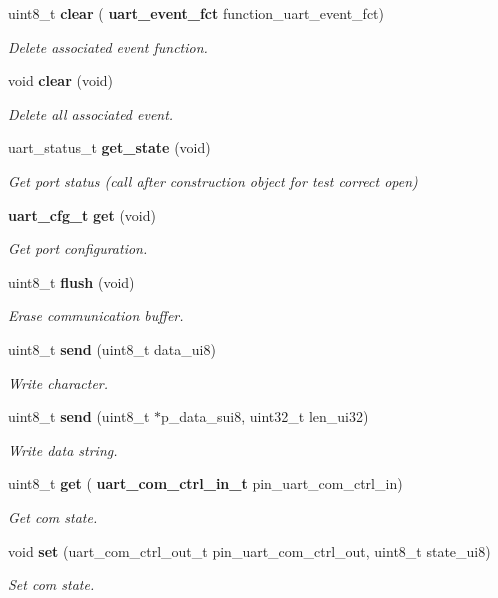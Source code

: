\begin{DoxyCompactItemize}
uint8\+\_\+t \textbf{ clear} (\textbf{ uart\+\_\+event\+\_\+fct} function\+\_\+uart\+\_\+event\+\_\+fct)
\begin{DoxyCompactList}\small\item\em Delete associated event function. \end{DoxyCompactList}\item 
void \textbf{ clear} (void)
\begin{DoxyCompactList}\small\item\em Delete all associated event. \end{DoxyCompactList}\item 
uart\+\_\+status\+\_\+t \textbf{ get\+\_\+state} (void)
\begin{DoxyCompactList}\small\item\em Get port status (call after construction object for test correct open) \end{DoxyCompactList}\item 
\textbf{ uart\+\_\+cfg\+\_\+t} \textbf{ get} (void)
\begin{DoxyCompactList}\small\item\em Get port configuration. \end{DoxyCompactList}\item 
uint8\+\_\+t \textbf{ flush} (void)
\begin{DoxyCompactList}\small\item\em Erase communication buffer. \end{DoxyCompactList}\item 
uint8\+\_\+t \textbf{ send} (uint8\+\_\+t data\+\_\+ui8)
\begin{DoxyCompactList}\small\item\em Write character. \end{DoxyCompactList}\item 
uint8\+\_\+t \textbf{ send} (uint8\+\_\+t $\ast$p\+\_\+data\+\_\+sui8, uint32\+\_\+t len\+\_\+ui32)
\begin{DoxyCompactList}\small\item\em Write data string. \end{DoxyCompactList}\item 
uint8\+\_\+t \textbf{ get} (\textbf{ uart\+\_\+com\+\_\+ctrl\+\_\+in\+\_\+t} pin\+\_\+uart\+\_\+com\+\_\+ctrl\+\_\+in)
\begin{DoxyCompactList}\small\item\em Get com state. \end{DoxyCompactList}\item 
void \textbf{ set} (uart\+\_\+com\+\_\+ctrl\+\_\+out\+\_\+t pin\+\_\+uart\+\_\+com\+\_\+ctrl\+\_\+out, uint8\+\_\+t state\+\_\+ui8)
\begin{DoxyCompactList}\small\item\em Set com state. \end{DoxyCompactList}\end{DoxyCompactItemize}


